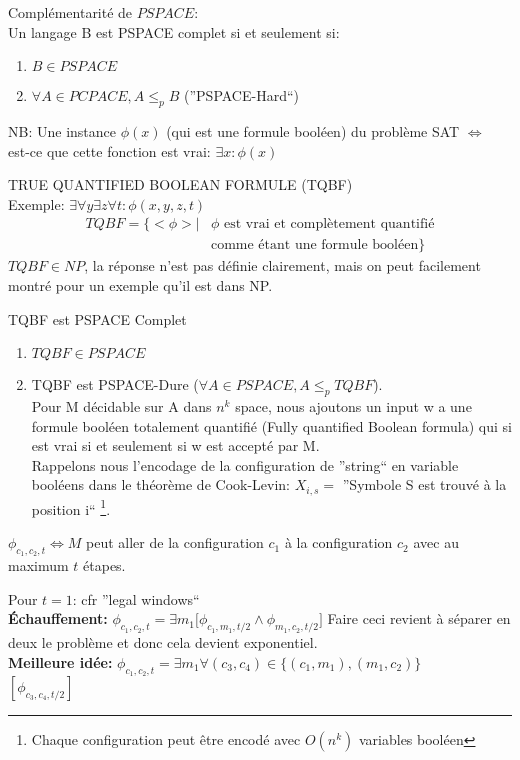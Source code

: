 \documentclass[a4paper,12pt]{article}
\begin{document}
    Complémentarité de $PSPACE$:\\
    Un langage B est PSPACE complet si et seulement si:
    \begin{enumerate}
     \item $B \in PSPACE$
     \item $\forall A \in PCPACE, A \leq_p B$ (''PSPACE-Hard``)
    \end{enumerate}
    NB: Une instance $\phi(x)$ (qui est une formule booléen) du problème SAT $\Leftrightarrow$ est-ce que cette fonction est vrai: $\exists x : \phi(x)$
    
    TRUE QUANTIFIED BOOLEAN FORMULE (TQBF)\\
    Exemple: $\exists \forall y \exists z \forall t: \phi(x, y, z, t)$\\
    
    \begin{align*}
      TQBF = \Big\{<\phi> | &\phi \text{ est vrai et complètement quantifié}\\
      &\text{comme étant une formule booléen}\Big\}
    \end{align*}
    $TQBF \in NP$, la réponse n'est pas définie clairement, mais on peut facilement montré pour un exemple qu'il est dans NP.
    
    \begin{theoremeBox}
      TQBF est PSPACE Complet
      \begin{enumerate}
       \item $TQBF \in PSPACE$
       \item TQBF est PSPACE-Dure ($\forall A \in PSPACE, A \leq_p TQBF$).\\
	Pour M décidable sur A dans $n^k$ space, nous ajoutons un input w a une formule booléen totalement quantifié (Fully quantified Boolean formula) qui si est vrai si et seulement si w est accepté par M.\\
	Rappelons nous l'encodage de la configuration de ''string`` en variable booléens dans le théorème de Cook-Levin: $X_{i, s} =$ ''Symbole S est trouvé à la position i`` \footnote{Chaque configuration peut être encodé avec $O(n^k)$ variables booléen}.
      \end{enumerate}
    \end{theoremeBox}
    $\phi_{c_1, c_2, t} \Leftrightarrow M$ peut aller de la configuration $c_1$ à la configuration $c_2$ avec au maximum $t$ étapes.

    Pour $t = 1$: cfr ''legal windows``\\
    \textbf{Échauffement:} $\phi_{c_1, c_2, t} = \exists m_1 \big[\phi_{c_1, m_1, t/2} \wedge \phi_{m_1, c_2, t/2}\big]$
    Faire ceci revient à séparer en deux le problème et donc cela devient exponentiel.\\
    \textbf{Meilleure idée:} $\phi_{c_1, c_2, t} = \exists m_1 \forall (c_3, c_4) \in \big\{(c_1, m_1), (m_1, c_2)\big\}$\\
    $[\phi_{c_3, c_4, t/2}]$
    
\end{document}
